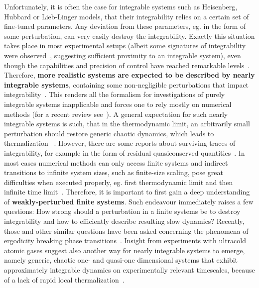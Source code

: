 Unfortunately, it is often the case for integrable systems such as Heisenberg, Hubbard or Lieb-Linger
models, that their integrability relies on a certain set of fine-tuned parameters. Any deviation from these parameters, eg.
in the form of some perturbation, can very easily destroy the integrability. Exactly this situation takes place in most
experimental setups (albeit some signatures of integrability were observed~\autocite{Khemani2019}, suggesting sufficient
proximity to an integrable system),  even though the capabilities and precision of control have
reached remarkable levels~\autocite{Browaeys2020}. Therefore, \textbf{more realistic systems
are expected to be described by nearly integrable systems}, containing some non-negligible perturbations that
impact integrability~\autocite{Zotos2004,Brandino2015}.
This renders all the formalism for investigations of purely
integrable systems inapplicable and forces one to rely mostly on numerical methods (for a recent review
see~\textcite{Bertini2021}).
A general expectation for such nearly integrable systems is such, that in the thermodynamic limit, an
arbitrarily small perturbation should restore generic chaotic dynamics, which leads to thermalization
~\autocite{LeBlond2021}. However, there
are some reports about surviving traces of integrability, for example in the form of residual quasiconserved
quantities~\autocite{Brandino2015}. In most cases numerical methods can only access finite 
systems and indirect transitions to infinite system sizes, such as finite-size scaling, pose great difficulties
when executed properly, eg. first thermodynamic limit and then infinite time limit~\autocite{Sirker2014,CamposVenuti2010}.
Therefore, it is important to first gain a deep understanding of \textbf{weakly-perturbed finite systems}. Such
endeavour immediately raises a few questions: How strong should a perturbation in a finite
systems be to destroy integrability and how to efficiently describe resulting slow dynamics? 
Recently, those and other similar questions have been asked concerning the phenomena of ergodicity breaking
phase transitions~\autocite{Suntajs2020,Suntajs2022}.
Insight from experiments with ultracold atomic gases suggest also another way for nearly integrable systems to emerge,
namely generic, chaotic one- and quasi-one dimensional systems that exhibit approximately integrable dynamics on experimentally relevant timescales,
because of a lack of rapid local thermalization~\autocite{Polkovnikov2011863,Gopalakrishnan2023}.

